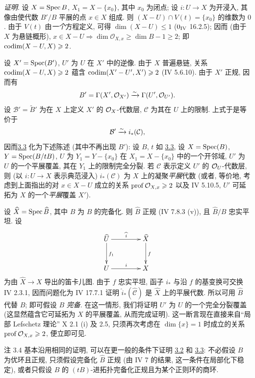 \noindent
\emph{证明}. 设 $X=\operatorname{Spec} B$, $X_1=X-\{x_0\}$, 其中 $x_0$ 为闭点; 设 $i:U\rightarrow X$ 为开浸入, 其像由使代数 $B'/B$ 平展的点 $x\in X$ 组成. 则 $(X-U)\cap V(t)=\{x_0\}$ 的维数为 $0$. 由于 $V(t)$ 由\emph{一个}方程定义, 可得 $\dim(X-U)\leq 1$ (\EGA $0_{\text{\rm IV}}$ 16.2.5); 因而 (由于 $X$ 为悬链概形), $x\in X-U\Rightarrow \dim \mathcal{O}_{X,x}\geq \dim B-1\geq 2$; 即 $\operatorname{codim}(X-U,X)\geqslant 2$.

设 $X'=\operatorname{Spec}(B')$, $U'$ 为 $U$ 在 $X'$ 中的逆像. 由于 $X$ 普遍悬链, 关系 $\operatorname{codim}(X-U,X)\geqslant 2$ 蕴含 $\operatorname{codim}(X'-U',X')\geqslant 2$ (\EGA IV 5.6.10). 由于 $X'$ 正规, 因而有
$$
B'=\Gamma(X',{\mathcal O}_{X'})\xrightarrow{\sim}
\Gamma(U',{\mathcal O}_{U'}){}.
$$
设 $\mathcal{B}'=\widetilde{B}'$ 为在 $X$ 上定义 $X'$ 的 ${\mathcal O}_X$-代数层, $\mathcal{C}$ 为其在 $U$ 上的限制. 上式于是等价于
$$
\mathcal{B}'\xrightarrow{\sim}i_{\ast}(\mathcal{C}){},
$$
因而\pageoriginale \hyperref[XV.lem3.3]{3.3} 化为下述陈述 (其中不再出现 $B'$): 设 $B$, $t$ 如 \hyperref[XV.lem3.3]{3.3}, 设 $X=\operatorname{Spec}(B)$, $Y=\operatorname{Spec}(B/tB)$, $U$ 为 $Y_1=Y-\{x_0\}$ 在 $X_1=X-\{x_0\}$ 中的一个开邻域, $U'$ 为 $U$ 的一个平展覆盖, 其在 $Y_1$ 上的限制完全分裂. 若 $\mathcal{C}$ 表示定义 $U'$ 的 ${\mathcal O}_U$-代数层, 则 (以 $i:U\rightarrow X$ 表示典范浸入) $i_{\ast}(\mathcal{C})$ 为 $X$ 上的凝聚\emph{平展}代数 (或者, 等价地, 考虑到上面指出的对 $x\in X-U$ 成立的关系 $\operatorname{prof} {\mathcal O}_{X,x}\geqslant 2$ 以及 \EGA IV 5.10.5, $U'$ 可延拓为 $X$ 的一个\emph{平展}覆盖 $X'$).

设 $\widehat{X}=\operatorname{Spec}\widehat{B}$, 其中 $\widehat{B}$ 为 $B$ 的完备化. 则 $\widehat{B}$ 正规 (\EGA IV 7.8.3 (v)), 且 $\widehat{B}/B$ 忠实平坦. 设
$$
\xymatrix@C=1.5cm@R=1cm{
\hat{U}      \ar[r]^{\sisi{\hat{i}}{\hat{i}}} \ar[d]^{f_1}& \hat{X} \ar[d]^{f}\\
U            \ar[r]^{i} &  X
}
$$
为由 $\widehat{X}\rightarrow X$ 导出的笛卡儿图. 由于 $f$ 忠实平坦, 函子 $i_{\ast}$ 与沿 $f$ 的基变换可交换 \sisi{(}{}\EGA IV 2.3.1\sisi{)}{}, 因而问题化为 \sisi{(}{}\EGA IV 17.7.1\sisi{)}{} 证明 $\hat{i}_{\ast}(\widehat{\mathcal{C}})$ 是 $\widehat{X}$ 上的平展代数. 所以可用 $\widehat{B}$ 代替 $B$; 即可假设 $B$ \emph{完备}. 在这一情形, 我们将证明 $U'$ 为 $U$ 的一个完全分裂覆盖 (这显然蕴含它可延拓为 $X$ 的平展覆盖, 从而完成证明). 这一断言现在直接来自“局部 Lefschetz 理论” \sisi{(}{}\SGA{} X 2.1 (i) 及 2.5\sisi{)}{}, 只须再次考虑在 $\dim \{x\}=1$ 时成立的关系 $\operatorname{prof} {\mathcal O}_{X,x}\geqslant 2$, 便立即可见.

\begin{enonce*}[remark]{注 3.4}
基本沿用相同的证明, 可以在更一般的条件下证明 \hyperref[XV.lem3.2]{3.2} 和 \hyperref[XV.lem3.3]{3.3}: 不必假设 $B$ 为优环且正规, 只须假设完备化 $\widehat{B}$ 正规 (由 \EGA IV 7 的结果, 这一条件在局部化下稳定), 或者只假设 $B$ 的 $(tB)$-进拓扑完备化正规且为某个正则环的商环.
\end{enonce*}

